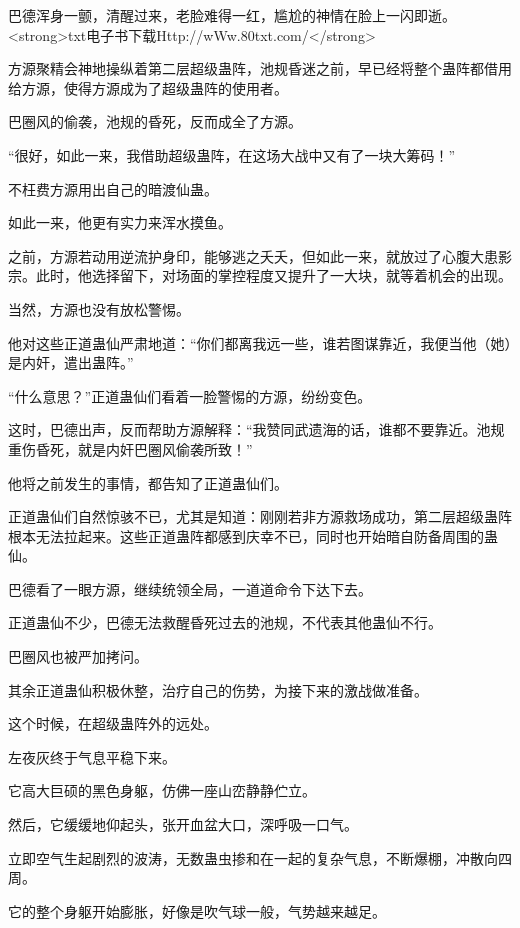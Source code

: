 
\begin{this_body}

巴德浑身一颤，清醒过来，老脸难得一红，尴尬的神情在脸上一闪即逝。<strong>txt电子书下载Http://wWw.80txt.com/</strong>

方源聚精会神地操纵着第二层超级蛊阵，池规昏迷之前，早已经将整个蛊阵都借用给方源，使得方源成为了超级蛊阵的使用者。

巴圈风的偷袭，池规的昏死，反而成全了方源。

“很好，如此一来，我借助超级蛊阵，在这场大战中又有了一块大筹码！”

不枉费方源用出自己的暗渡仙蛊。

如此一来，他更有实力来浑水摸鱼。

之前，方源若动用逆流护身印，能够逃之夭夭，但如此一来，就放过了心腹大患影宗。此时，他选择留下，对场面的掌控程度又提升了一大块，就等着机会的出现。

当然，方源也没有放松警惕。

他对这些正道蛊仙严肃地道：“你们都离我远一些，谁若图谋靠近，我便当他（她）是内奸，遣出蛊阵。”

“什么意思？”正道蛊仙们看着一脸警惕的方源，纷纷变色。

这时，巴德出声，反而帮助方源解释：“我赞同武遗海的话，谁都不要靠近。池规重伤昏死，就是内奸巴圈风偷袭所致！”

他将之前发生的事情，都告知了正道蛊仙们。

正道蛊仙们自然惊骇不已，尤其是知道：刚刚若非方源救场成功，第二层超级蛊阵根本无法拉起来。这些正道蛊阵都感到庆幸不已，同时也开始暗自防备周围的蛊仙。

巴德看了一眼方源，继续统领全局，一道道命令下达下去。

正道蛊仙不少，巴德无法救醒昏死过去的池规，不代表其他蛊仙不行。

巴圈风也被严加拷问。

其余正道蛊仙积极休整，治疗自己的伤势，为接下来的激战做准备。

这个时候，在超级蛊阵外的远处。

左夜灰终于气息平稳下来。

它高大巨硕的黑色身躯，仿佛一座山峦静静伫立。

然后，它缓缓地仰起头，张开血盆大口，深呼吸一口气。

立即空气生起剧烈的波涛，无数蛊虫掺和在一起的复杂气息，不断爆棚，冲散向四周。

它的整个身躯开始膨胀，好像是吹气球一般，气势越来越足。


\end{this_body}
